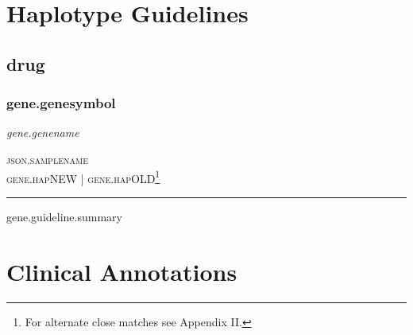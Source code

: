 \documentclass{report}
\begin{document}
\normalsize

\newpage

\section{Haplotype Guidelines}

{%

{%

\subsection{ {{drug}} }

{%

  {%
      \subsubsection{ {{gene.genesymbol}} }
     \textit{ {{gene.genename }} } \begin{flushright} \textsc{ {{json.samplename}} \\ {{gene.hapNEW}}  | {{gene.hapOLD}}\footnote{For alternate close matches see Appendix II.} }\end{flushright}
      \hrule \vspace{6pt}
      {{gene.guideline.summary}} \newline
      \scriptsize
      {%
      {%
      \normalsize
      {%
    {%
  {%
{%

\newpage

\section{Clinical Annotations}

{%

{%

}}}}}}}}}}}}
\end{document}
